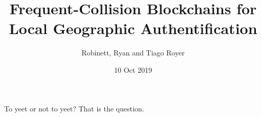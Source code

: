 \documentclass{article}
\title{Frequent-Collision Blockchains for Local Geographic Authentification}
\author{Robinett, Ryan and Tiago Royer}
\date{10 Oct 2019}
\begin{document}
\maketitle

To yeet or not to yeet? That is the question.
\end{document}
